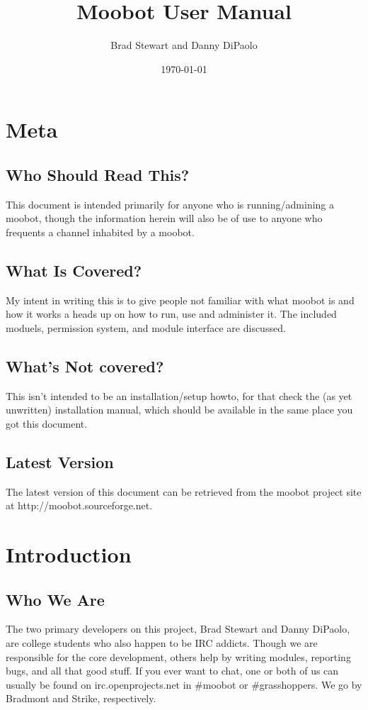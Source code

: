 \documentclass[titlepage]{article}
\author{Brad Stewart and Danny DiPaolo}
\title{Moobot User Manual}
\date{\today}
\begin{document}
	\maketitle
	\tableofcontents
	\newpage

	\section{Meta}
		\subsection{Who Should Read This?}
			This document is intended primarily for anyone who is running/admining a moobot, though the information herein will also be of use to anyone who frequents a channel inhabited by a moobot.
		\subsection{What Is Covered?}
			My intent in writing this is to give people not familiar with what moobot is and how it works a heads up on how to run, use and administer it.  The included moduels, permission system, and module interface are discussed.
		\subsection{What's Not covered?}
			This isn't intended to be an installation/setup howto, for that check the (as yet unwritten) installation manual, which should be available in the same place you got this document.
		\subsection{Latest Version}
			The latest version of this document can be retrieved from the moobot project site at http://moobot.sourceforge.net.

	\section{Introduction}
		\subsection{Who We Are}
			The two primary developers on this project, Brad Stewart and Danny DiPaolo, are college students who also happen to be IRC addicts.  Though we are responsible for the core development, others help by writing modules, reporting bugs, and all that good stuff.  If you ever want to chat, one or both of us can usually be found on irc.openprojects.net in \#moobot or \#grasshoppers.  We go by Bradmont and Strike, respectively.
\end{document}
